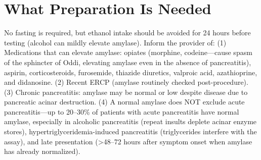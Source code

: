 \section*{What Preparation Is Needed}
No fasting is required, but ethanol intake should be avoided for 24 hours before testing (alcohol can mildly elevate amylase). Inform the provider of: (1) Medications that can elevate amylase: opiates (morphine, codeine---cause spasm of the sphincter of Oddi, elevating amylase even in the absence of pancreatitis), aspirin, corticosteroids, furosemide, thiazide diuretics, valproic acid, azathioprine, and didanosine. (2) Recent ERCP (amylase routinely checked post-procedure). (3) Chronic pancreatitis: amylase may be normal or low despite disease due to pancreatic acinar destruction. (4) A normal amylase does NOT exclude acute pancreatitis---up to 20--30\% of patients with acute pancreatitis have normal amylase, especially in alcoholic pancreatitis (repeat insults deplete acinar enzyme stores), hypertriglyceridemia-induced pancreatitis (triglycerides interfere with the assay), and late presentation (>48--72 hours after symptom onset when amylase has already normalized).

